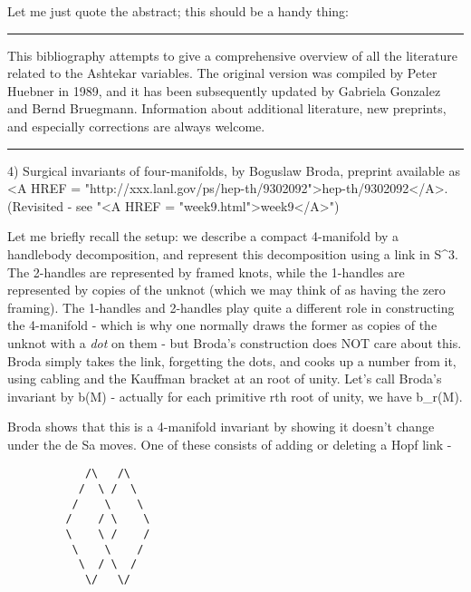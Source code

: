 Let me just quote the abstract; this should be a handy thing:

\par\noindent\rule{\textwidth}{0.4pt}
This bibliography attempts to give a comprehensive overview of all the
literature related to the Ashtekar variables. The original version was
compiled by Peter Huebner in 1989, and it has been subsequently
updated by Gabriela Gonzalez and Bernd Bruegmann.  Information about
additional literature, new preprints, and especially corrections are
always welcome.
\par\noindent\rule{\textwidth}{0.4pt}

4)  Surgical invariants of four-manifolds, by Boguslaw Broda, preprint
available as <A HREF = "http://xxx.lanl.gov/ps/hep-th/9302092">hep-th/9302092</A>.   (Revisited - see "<A HREF = "week9.html">week9</A>")

Let me briefly recall the setup: we describe a compact 4-manifold by a
handlebody decomposition, and represent this decomposition using a link
in S^3.  The 2-handles are represented by framed knots, while the
1-handles are represented by copies of the unknot (which we may think of
as having the zero framing).  The 1-handles and 2-handles play quite a
different role in constructing the 4-manifold  - which is why one
normally draws the former as copies of the unknot with a \emph{dot} on them -
but Broda's construction does NOT care about this.  Broda simply takes
the link, forgetting the dots, and cooks up a number from it, using
cabling and the Kauffman bracket at an root of unity.  Let's call
Broda's invariant by b(M) - actually for each primitive rth root of
unity, we have b_r(M). 

Broda shows that this is a 4-manifold invariant by showing it doesn't
change under the de Sa moves.  One of these consists of adding or
deleting a Hopf link -






























\begin{verbatim}
            /\   /\
           /  \ /  \
          /    \    \       
         /    / \    \       
         \    \ /    /
          \    \    /
           \  / \  /
            \/   \/
\end{verbatim}
    

